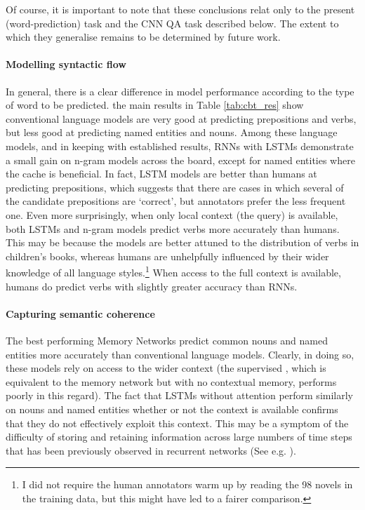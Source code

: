 Of course, it is important to note that these conclusions relat only to the present (word-prediction) task and the CNN QA task described below. The extent to which they generalise remains to be determined by future work. 

\paragraph{Modelling syntactic flow} 
In general, there is a clear difference in model performance according
to the type of word to be predicted. the main results in Table \ref{tab:cbt_res}
show  conventional language models are very good at
predicting prepositions and verbs, but less good at predicting named
entities and nouns. Among these language models, and in keeping with
established results, RNNs with LSTMs demonstrate a small gain on
n-gram models across the board, except for named entities where the cache is beneficial. 
In fact, LSTM models are better than humans at predicting prepositions, which suggests that there are cases in which several of the candidate prepositions are `correct', but annotators prefer the less frequent one.  Even more surprisingly, when only local context (the query) is available, both LSTMs and n-gram models predict verbs more accurately than humans. This may be because the models are better attuned to the distribution of verbs in children's books, whereas humans are unhelpfully influenced by their wider knowledge of all language styles.\footnote{I did not require the human annotators warm up by reading the 98 novels in the training data, but this might have led to a fairer comparison.} When access to the full context is available, humans do predict verbs with slightly greater accuracy than RNNs. 

\paragraph{Capturing semantic coherence} The best performing Memory
Networks predict common nouns and named entities more
accurately than conventional language models. Clearly, in doing so,
these models rely on access to the wider context (the
supervised {\small {}}, which is equivalent to the
memory network but with no contextual memory, performs poorly in this
regard). The fact that LSTMs without attention perform similarly on
nouns and named entities whether or not the context is available
confirms that they do not effectively exploit this context. This may
be a symptom of the difficulty of storing and retaining information
across large numbers of time steps that has been previously observed
in recurrent networks (See e.g. \cite{bengio1994learning}). 

